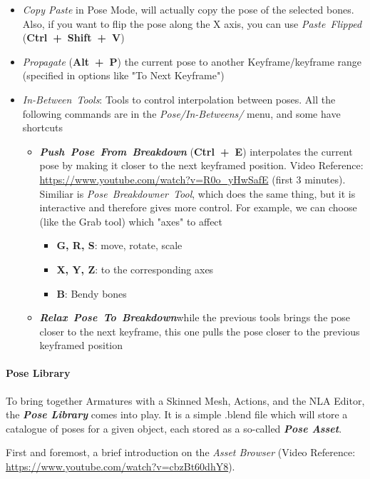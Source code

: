 \documentclass{article}
\begin{document}
\begin{itemize}[topsep=0pt, noitemsep]
    \item \textit{Copy Paste} in Pose Mode, will actually copy the pose of the selected bones. Also, if you want to flip the pose along the X axis, you can use \mbox{\textit{Paste Flipped}} (\mbox{\textbf{Ctrl + Shift + V}})
    \item \textit{Propagate} (\mbox{\textbf{Alt + P}}) the current pose to another Keyframe/keyframe range (specified in options like "To Next Keyframe")
    \item \mbox{\textit{In-Between Tools}}: Tools to control interpolation between poses. All the following commands are in the \mbox{\textit{Pose/In-Betweens/}} menu, and some have shortcuts
    \begin{itemize}[noitemsep]
        \item \mbox{\textbf{\textit{Push Pose From Breakdown}}} (\mbox{\textbf{Ctrl + E}}) interpolates the current pose by making it closer to the next keyframed position. 
        Video Reference: \href{https://www.youtube.com/watch?v=R0o_yHwSafE}{https://www.youtube.com/watch?v=R0o\_yHwSafE} (first 3 minutes).\\ Similiar is \mbox{\textit{Pose Breakdowner Tool}}, which does 
        the same thing, but it is interactive and therefore gives more control. For example, we can choose (like the Grab tool) which "axes" to affect
        \begin{itemize}[topsep=0pt, noitemsep]
            \item \textbf{G, R, S}: move, rotate, scale
            \item \textbf{X, Y, Z}: to the corresponding axes
            \item \textbf{B}: Bendy bones
        \end{itemize}
        \item \mbox{\textbf{\textit{Relax Pose To Breakdown}}}\footnotemark while the previous tools brings the pose closer to the next keyframe, this one pulls the pose closer to the previous keyframed position
    \end{itemize}
\end{itemize}

\paragraph{Pose Library}
To bring together Armatures with a Skinned Mesh, Actions, and the NLA Editor, the \textbf{\textit{Pose Library}} comes into play. It is a simple .blend file which will store a catalogue of poses for a 
given object, each stored as a so-called \textit{\textbf{Pose Asset}}.\par
First and foremost, a brief introduction on the \textit{Asset Browser} (\small Video Reference: \href{https://www.youtube.com/watch?v=cbzBt60dhY8}{https://www.youtube.com/watch?v=cbzBt60dhY8}).\par
\end{document}
